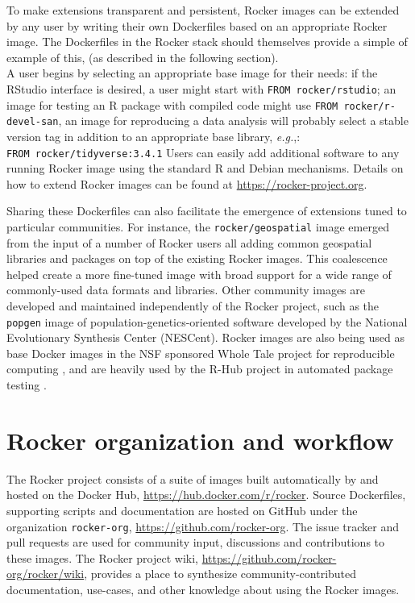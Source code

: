 To make extensions transparent and persistent, Rocker images can be
extended by any user by writing their own Dockerfiles based on an
appropriate Rocker image. The Dockerfiles in the Rocker stack should
themselves provide a simple of example of this, (as described in the
following section).\\
A user begins by selecting an appropriate base image for their needs: if
the RStudio\textsuperscript{\textregistered} interface is desired, a
user might start with \texttt{FROM\ rocker/rstudio}; an image for
testing an R package with compiled code might use
\texttt{FROM\ rocker/r-devel-san}, an image for reproducing a data
analysis will probably select a stable version tag in addition to an
appropriate base library, \emph{e.g.},:
\texttt{FROM\ rocker/tidyverse:3.4.1} Users can easily add additional
software to any running Rocker image using the standard R and Debian
mechanisms. Details on how to extend Rocker images can be found at
\url{https://rocker-project.org}.

Sharing these Dockerfiles can also facilitate the emergence of
extensions tuned to particular communities. For instance, the
\texttt{rocker/geospatial} image emerged from the input of a number of
Rocker users all adding common geospatial libraries and packages on top
of the existing Rocker images. This coalescence helped create a more
fine-tuned image with broad support for a wide range of commonly-used
data formats and libraries. Other community images are developed and
maintained independently of the Rocker project, such as the
\texttt{popgen} image of population-genetics-oriented software developed
by the National Evolutionary Synthesis Center (NESCent). Rocker images
are also being used as base Docker images in the NSF sponsored Whole
Tale project for reproducible computing \citep{wholetale}, and are
heavily used by the R-Hub project in automated package testing
\citep{rhub}.

\section{Rocker organization and
workflow}\label{rocker-organization-and-workflow}

The Rocker project consists of a suite of images built automatically by
and hosted on the Docker Hub, \url{https://hub.docker.com/r/rocker}.
Source Dockerfiles, supporting scripts and documentation are hosted on
GitHub under the organization \texttt{rocker-org},
\url{https://github.com/rocker-org}. The issue tracker and pull requests
are used for community input, discussions and contributions to these
images. The Rocker project wiki,
\url{https://github.com/rocker-org/rocker/wiki}, provides a place to
synthesize community-contributed documentation, use-cases, and other
knowledge about using the Rocker images.

